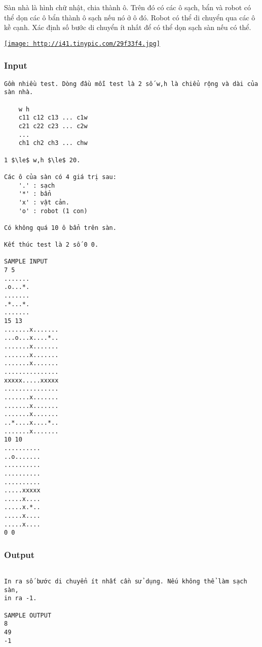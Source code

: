 

Sàn nhà là hình chữ nhật, chia thành ô. Trên đó có các ô sạch, bẩn và robot có thể dọn các ô bẩn thành ô sạch nếu nó ở ô đó. Robot có thể di chuyển qua các ô kề cạnh. Xác định số bước di chuyển ít nhất để có thể dọn sạch sàn nếu có thể.

\href{http://tinypic.com}{
\texttt{[image: http://i41.tinypic.com/29f33f4.jpg]}}

\subsubsection{Input}
\begin{verbatim}
Gồm nhiều test. Dòng đầu mỗi test là 2 số w,h là chiểu rộng và dài của sàn nhà. 

    w h
    c11 c12 c13 ... c1w
    c21 c22 c23 ... c2w
    ...
    ch1 ch2 ch3 ... chw

1 $\le$ w,h $\le$ 20.

Các ô của sàn có 4 giá trị sau:
    '.' : sạch
    '*' : bẩn
    'x' : vật cản.
    'o' : robot (1 con)

Có không quá 10 ô bẩn trên sàn. 

Kết thúc test là 2 số 0 0.

SAMPLE INPUT
7 5
.......
.o...*.
.......
.*...*.
.......
15 13
.......x.......
...o...x....*..
.......x.......
.......x.......
.......x.......
...............
xxxxx.....xxxxx
...............
.......x.......
.......x.......
.......x.......
..*....x....*..
.......x.......
10 10
..........
..o.......
..........
..........
..........
.....xxxxx
.....x....
.....x.*..
.....x....
.....x....
0 0

\end{verbatim}

\subsubsection{Output}
\begin{verbatim}
 
In ra số bước di chuyển ít nhất cần sử dụng. Nếu không thể làm sạch sàn, 
in ra -1. 

SAMPLE OUTPUT
8
49
-1
\end{verbatim}
